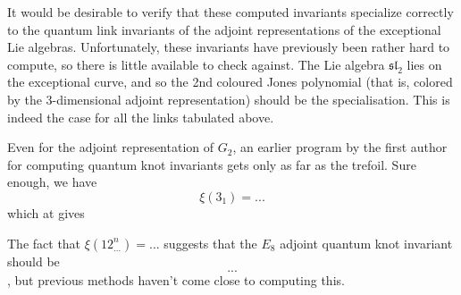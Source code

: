 \documentclass[12pt]{amsart}
\begin{document}
It would be desirable to verify that these computed invariants specialize correctly to the
quantum link invariants of the adjoint representations of the exceptional Lie algebras.
Unfortunately, these invariants have previously been rather hard to compute, so there is little
available to check against. The Lie algebra $\mathfrak{sl}_2$ lies on the exceptional curve, and
so the 2nd coloured Jones polynomial 
(that is, colored by the 3-dimensional adjoint representation) 
should be the  specialisation. This is indeed the case for all the links
tabulated above.

Even for the adjoint representation of $G_2$, an earlier program by the first author
for computing quantum knot invariants gets only as far as the trefoil. Sure enough, we have
$$\xi(3_1) = ...$$
which at  gives 


The fact that $\xi(12^n_{...}) = ...$ suggests that the $E_8$ adjoint quantum knot invariant should be
$$...$$, but previous methods haven't come close to computing this.



\end{document}
